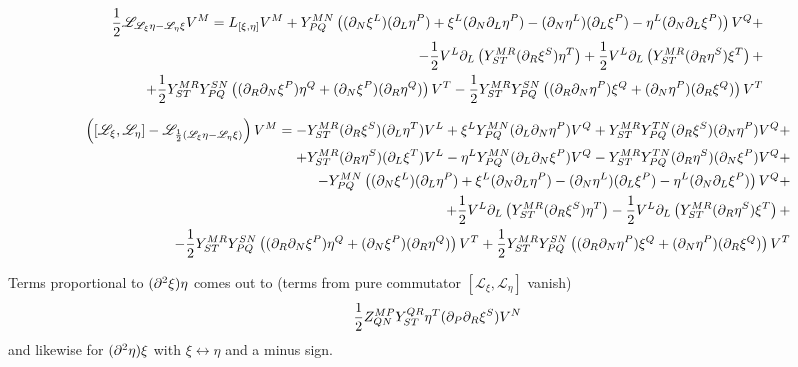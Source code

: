 \documentclass{article}
\begin{document}
\begin{align*}
\frac{1}{2}\mathscr{L}_{\mathscr{L_\xi}\eta-\mathscr{L_\eta}\xi}V^M = L_{[\xi,\eta]}V^M+Y^{MN}_{PQ}\left((\partial_N\xi^L)(\partial_L\eta^P)+\xi^L(\partial_N\partial_L\eta^P)-(\partial_N\eta^L)(\partial_L\xi^P)-\eta^L(\partial_N\partial_L\xi^P)\right)V^Q+\\
-\frac{1}{2}V^L\partial_L\left(Y^{MR}_{ST}(\partial_R\xi^S)\eta^T\right)+\frac{1}{2}V^L\partial_L\left(Y^{MR}_{ST}(\partial_R\eta^S)\xi^T\right)+\\
+\frac{1}{2}Y^{MR}_{ST}Y^{SN}_{PQ}\left((\partial_R\partial_N\xi^P)\eta^Q+(\partial_N\xi^P)(\partial_R\eta^Q)\right)V^T-\frac{1}{2}Y^{MR}_{ST}Y^{SN}_{PQ}\left((\partial_R\partial_N\eta^P)\xi^Q+(\partial_N\eta^P)(\partial_R\xi^Q)\right)V^T
\end{align*}

\begin{align*}
    \left([\mathscr{L}_\xi,\mathscr{L}_\eta]-\mathscr{L}_{\frac{1}{2}\left(\mathscr{L}_\xi\eta-\mathscr{L}_\eta\xi\right)}\right)V^M = -Y^{MR}_{ST}(\partial_R\xi^S)(\partial_L\eta^T) V^L+\xi^LY^{MN}_{PQ}(\partial_L\partial_N\eta^P)V^Q+Y^{MR}_{ST}Y^{TN}_{PQ}(\partial_R\xi^S)(\partial_N\eta^P)V^Q+\\
    +Y^{MR}_{ST}(\partial_R\eta^S)(\partial_L\xi^T)V^L-\eta^LY^{MN}_{PQ}(\partial_L\partial_N\xi^P)V^Q-Y^{MR}_{ST}Y^{TN}_{PQ}(\partial_R\eta^S)(\partial_N\xi^P)V^Q+\\
    -Y^{MN}_{PQ}\left((\partial_N\xi^L)(\partial_L\eta^P)+\xi^L(\partial_N\partial_L\eta^P)-(\partial_N\eta^L)(\partial_L\xi^P)-\eta^L(\partial_N\partial_L\xi^P)\right)V^Q+\\
+\frac{1}{2}V^L\partial_L\left(Y^{MR}_{ST}(\partial_R\xi^S)\eta^T\right)-\frac{1}{2}V^L\partial_L\left(Y^{MR}_{ST}(\partial_R\eta^S)\xi^T\right)+\\
-\frac{1}{2}Y^{MR}_{ST}Y^{SN}_{PQ}\left((\partial_R\partial_N\xi^P)\eta^Q+(\partial_N\xi^P)(\partial_R\eta^Q)\right)V^T+\frac{1}{2}Y^{MR}_{ST}Y^{SN}_{PQ}\left((\partial_R\partial_N\eta^P)\xi^Q+(\partial_N\eta^P)(\partial_R\xi^Q)\right)V^T
\end{align*}

Terms proportional to $(\partial^2\xi)\eta$ comes out to (terms from pure commutator $[\mathscr{L}_\xi,\mathscr{L}_\eta]$ vanish)
\begin{equation}
    \frac{1}{2}Z_{QN}^{MP}Y^{QR}_{ST}\eta^T(\partial_P\partial_R\xi^S)V^N
\end{equation}
and likewise for $(\partial^2\eta)\xi$ with $\xi\leftrightarrow\eta$ and a minus sign.
\end{document}
